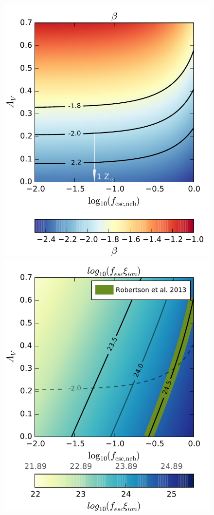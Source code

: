\begin{landscape}
\begin{figure}
\centering
  \includegraphics[width=0.25\paperheight]{plots/Fig6a.pdf}
  \includegraphics[width=0.25\paperheight]{plots/Fig6b.pdf}

\end{figure}
\end{landscape}
